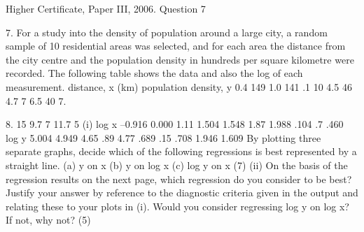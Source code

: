 \documentclass[a4paper,12pt]{article}
\begin{document}
Higher Certificate, Paper III, 2006. Question 7
\begin{framed}
7.
For a study into the density of population around a large city, a random sample of 10
residential areas was selected, and for each area the distance from the city centre and
the population density in hundreds per square kilometre were recorded. The following
table shows the data and also the log of each measurement.
distance, x (km) population density, y
0.4
149
1.0
141
.1
10
4.5
46
4.7
7
6.5
40
7.

8.
15
9.7
7
11.7
5
(i)
log x
–0.916
0.000
1.11
1.504
1.548
1.87
1.988
.104
.7
.460
log y
5.004
4.949
4.65
.89
4.77
.689
.15
.708
1.946
1.609
By plotting three separate graphs, decide which of the following regressions is
best represented by a straight line.
(a)
y on x
(b) y on log x
(c) log y on x
(7)
(ii) On the basis of the regression results on the next page, which regression do
you consider to be best? Justify your answer by reference to the diagnostic
criteria given in the output and relating these to your plots in (i). Would you
consider regressing log y on log x? If not, why not?
(5)

\end{framed}
\end{document}
